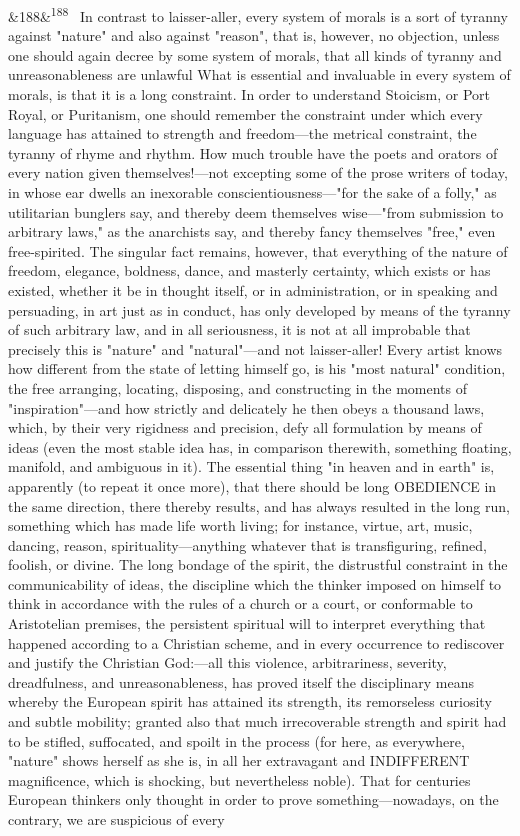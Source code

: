 \documentclass[12pt]{article}
\newcommand{\para}[1][]{\par\noindent\ifx&#1&\else\textsuperscript{\footnotesize #1}~\fi}
\begin{document}
\para[188] In contrast to laisser-aller, every system of morals is a sort of tyranny against "nature" and also against "reason", that is, however, no objection, unless one should again decree by some system of morals, that all kinds of tyranny and unreasonableness are unlawful What is essential and invaluable in every system of morals, is that it is a long constraint. In order to understand Stoicism, or Port Royal, or Puritanism, one should remember the constraint under which every language has attained to strength and freedom---the metrical constraint, the tyranny of rhyme and rhythm. How much trouble have the poets and orators of every nation given themselves!---not excepting some of the prose writers of today, in whose ear dwells an inexorable conscientiousness---"for the sake of a folly," as utilitarian bunglers say, and thereby deem themselves wise---"from submission to arbitrary laws," as the anarchists say, and thereby fancy themselves "free," even free-spirited. The singular fact remains, however, that everything of the nature of freedom, elegance, boldness, dance, and masterly certainty, which exists or has existed, whether it be in thought itself, or in administration, or in speaking and persuading, in art just as in conduct, has only developed by means of the tyranny of such arbitrary law, and in all seriousness, it is not at all improbable that precisely this is "nature" and "natural"---and not laisser-aller! Every artist knows how different from the state of letting himself go, is his "most natural" condition, the free arranging, locating, disposing, and constructing in the moments of "inspiration"---and how strictly and delicately he then obeys a thousand laws, which, by their very rigidness and precision, defy all formulation by means of ideas (even the most stable idea has, in comparison therewith, something floating, manifold, and ambiguous in it). The essential thing "in heaven and in earth" is, apparently (to repeat it once more), that there should be long OBEDIENCE in the same direction, there thereby results, and has always resulted in the long run, something which has made life worth living; for instance, virtue, art, music, dancing, reason, spirituality---anything whatever that is transfiguring, refined, foolish, or divine. The long bondage of the spirit, the distrustful constraint in the communicability of ideas, the discipline which the thinker imposed on himself to think in accordance with the rules of a church or a court, or conformable to Aristotelian premises, the persistent spiritual will to interpret everything that happened according to a Christian scheme, and in every occurrence to rediscover and justify the Christian God:---all this violence, arbitrariness, severity, dreadfulness, and unreasonableness, has proved itself the disciplinary means whereby the European spirit has attained its strength, its remorseless curiosity and subtle mobility; granted also that much irrecoverable strength and spirit had to be stifled, suffocated, and spoilt in the process (for here, as everywhere, "nature" shows herself as she is, in all her extravagant and INDIFFERENT magnificence, which is shocking, but nevertheless noble). That for centuries European thinkers only thought in order to prove something---nowadays, on the contrary, we are suspicious of every 
\end{document}
